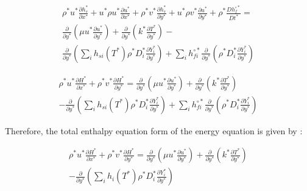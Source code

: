 \begin{equation}
\begin{split}
\rho^* u^* \frac{\partial h_s^*}{\partial x^*}
+
u^*
\rho u^*\frac{\partial u^*}{\partial x^*}
+
\rho^* v^* \frac{\partial h_s^*}{\partial y^*}
+
u^*
\rho v^*\frac{\partial u^*}{\partial y^*}
+
\rho^*
\frac{D h_{f}^{\circ*}}{D t^*}
=
\\
\frac{\partial}{\partial y^*}
\left(
    \mu
    u^*
    \frac{\partial u^*}{\partial y^*}
\right)
+
\frac{\partial}{\partial y^*}
\left(
    k^*\frac{\partial T^*}{\partial y^*}
\right)
-
\\
\frac{\partial}{\partial y^*}
\left(
        \sum_i
        h_{si}(T^*)
        \rho^* 
        D_i^*
        \frac{\partial Y_i^*}{\partial y^*}
\right)
+
\sum_i  
h_{fi}^{\circ*}
\frac{\partial }{\partial y^*}
\left(
    \rho^*D_i^*
    \frac{\partial Y_i^* }{\partial y^*}
\right)
\end{split}
\end{equation} 


\begin{equation}
\begin{split}
\rho^* u^* \frac{\partial H^*}{\partial x^*}
+
\rho^* v^* \frac{\partial H^*}{\partial y^*}
=
\frac{\partial}{\partial y^*}
\left(
    \mu
    u^*
    \frac{\partial u^*}{\partial y^*}
\right)
+
\frac{\partial}{\partial y^*}
\left(
    k^*\frac{\partial T^*}{\partial y^*}
\right)
\\
-
\frac{\partial}{\partial y^*}
\left(
        \sum_i
        h_{si}(T^*)
        \rho^* 
        D_i^*
        \frac{\partial Y_i^*}{\partial y^*}
\right)
+
\sum_i  
h_{fi}^{\circ*}
\frac{\partial }{\partial y^*}
\left(
    \rho^*D_i^*
    \frac{\partial Y_i^* }{\partial y^*}
\right)
\end{split}
\end{equation} 

Therefore, the total enthalpy equation form 
of the energy equation is given by :

\begin{equation}
\begin{split}
\rho^* u^* \frac{\partial H^*}{\partial x^*}
+
\rho^* v^* \frac{\partial H^*}{\partial y^*}
=
\frac{\partial}{\partial y^*}
\left(
    \mu
    u^*
    \frac{\partial u^*}{\partial y^*}
\right)
+
\frac{\partial}{\partial y^*}
\left(
    k^*\frac{\partial T^*}{\partial y^*}
\right)
\\
-
\frac{\partial}{\partial y^*}
\left(
        \sum_i
        h_{i}(T^*)
        \rho^* 
        D_i^*
        \frac{\partial Y_i^*}{\partial y^*}
\right)
\end{split}
\end{equation} 

